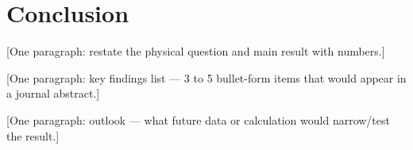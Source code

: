 \section{Conclusion}
\label{sec:conclusion}

[One paragraph: restate the physical question and main result with numbers.]

[One paragraph: key findings list — 3 to 5 bullet-form items that would appear in a journal abstract.]

[One paragraph: outlook — what future data or calculation would narrow/test the result.]
